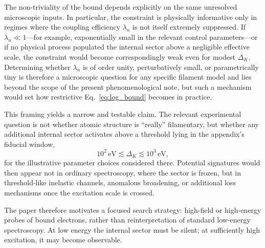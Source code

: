 \documentclass[pdflatex,sn-mathphys-num]{sn-jnl}
\begin{document}
        The non-triviality of the bound depends explicitly on the same unresolved microscopic inputs. In particular, the constraint is physically informative only in regimes where the coupling efficiency $\lambda_n$ is not itself extremely suppressed. If $\lambda_n \ll 1$---for example, exponentially small in the relevant control parameters---or if no physical process populated the internal sector above a negligible effective scale, the constraint would become correspondingly weak even for modest $\Delta_K$. Determining whether $\lambda_n$ is of order unity, perturbatively small, or parametrically tiny is therefore a microscopic question for any specific filament model and lies beyond the scope of the present phenomenological note, but such a mechanism would set how restrictive Eq.~\eqref{eq:log_bound} becomes in practice.

        This framing yields a narrow and testable claim. The relevant experimental question is not whether atomic structure is ``really'' filamentary, but whether any additional internal sector activates above a threshold lying in the appendix's fiducial window,
        \begin{equation}
            10^2\,\mathrm{eV} \lesssim \Delta_K \lesssim 10^3\,\mathrm{eV},
        \end{equation}
        for the illustrative parameter choices considered there. Potential signatures would then appear not in ordinary spectroscopy, where the sector is frozen, but in threshold-like inelastic channels, anomalous broadening, or additional loss mechanisms once the excitation scale is crossed.

        The paper therefore motivates a focused search strategy: high-field or high-energy probes of bound electrons, rather than reinterpretation of standard low-energy spectroscopy. At low energy the internal sector must be silent; at sufficiently high excitation, it may become observable.

        \appendix
\end{document}

